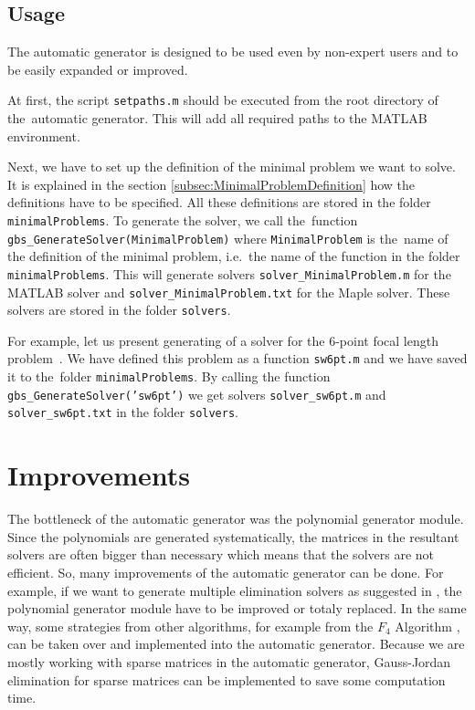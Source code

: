 \subsection{Usage}
The automatic generator is designed to be used even by non-expert users and to be easily expanded or improved.

At first, the script \texttt{setpaths.m} should be executed from the root directory of the~automatic generator. This will add all required paths to the MATLAB environment.

Next, we have to set up the definition of the minimal problem we want to solve. It is explained in the section \ref{subsec:MinimalProblemDefinition} how the definitions have to be specified. All these definitions are stored in the folder \texttt{minimalProblems}. To generate the solver, we call the~function \texttt{gbs\_GenerateSolver(MinimalProblem)} where \texttt{MinimalProblem} is the~name of the definition of the minimal problem, i.e.\ the name of the function in the folder \texttt{minimalProblems}. This will generate solvers \texttt{solver\_MinimalProblem.m} for the MATLAB solver and \texttt{solver\_MinimalProblem.txt} for the Maple solver. These solvers are stored in the folder \texttt{solvers}.

For example, let us present generating of a solver for the 6-point focal length problem~\cite{6pt}. We have defined this problem as a function \texttt{sw6pt.m} and we have saved it to the~folder \texttt{minimalProb\-lems}. By calling the function \texttt{gbs\_GenerateSolver('sw6pt')} we get solvers \texttt{solver\_sw6pt.m} and \texttt{solver\_sw6pt.txt} in the folder \texttt{solvers}.

\section{Improvements}
The bottleneck of the automatic generator \cite{AutoGen} was the polynomial generator module. Since the polynomials are generated systematically, the matrices in the resultant solvers are often bigger than necessary which means that the solvers are not efficient. So, many improvements of the automatic generator \cite{AutoGen} can be done. For example, if we want to generate multiple elimination solvers as suggested in \cite{KukelovaAlgMethods}, the polynomial generator module have to be improved or totaly replaced. In the same way, some strategies from other algorithms, for example from the $F_4$ Algorithm \cite{F4}, can be taken over and implemented into the automatic generator. Because we are mostly working with sparse matrices in the automatic generator, Gauss-Jordan elimination for sparse matrices can be implemented to save some computation time.

